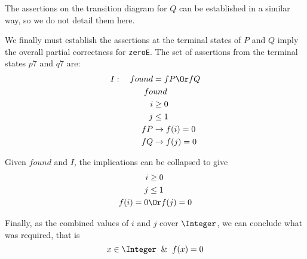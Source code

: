 \documentclass[12pt,a4paper]{scrartcl}
\begin{document}
The assertions on the transition diagram for $Q$ can be established in a similar way, so we do not detail them here.

We finally must establish the assertions at the terminal states of $P$ and $Q$ imply the overall partial correctness for \texttt{zeroE}.
The set of assertions from the terminal states $p7$ and $q7$ are:
\begin{align*}
    I: \quad found &= fP \Or fQ \\
    fo&und \\
    i &\ge 0 \\
    j &\le 1 \\
    fP &\rightarrow f(i) = 0 \\
    fQ &\rightarrow f(j) = 0
\end{align*}

Given $found$ and $I$, the implications can be collapsed to give
\begin{align*}
    i &\ge 0 \\
    j &\le 1 \\
    f(i) = 0 &\Or f(j) = 0
\end{align*}

Finally, as the combined values of $i$ and $j$ cover $\Integer$, we can conclude what was required, that is
\begin{equation}
    x \in \Integer \And f(x) = 0
\label{eq:og-conclusion}
\end{equation}
\end{document}
